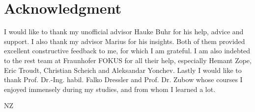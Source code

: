 
\cleardoublepage
{}
\section*{Acknowledgment}

I would like to thank my unofficial advisor Hauke Buhr for his help, advice and support. I also thank my advisor Marius for his insights. Both of them provided excellent constructive feedback to me, for which I am grateful. I am also indebted to the rest team at Fraunhofer FOKUS for all their help, especially Hemant Zope, Eric Troudt, Christian Scheich and Aleksandar Yonchev. Lastly I would like to thank Prof. Dr.-Ing. habil. Falko Dressler and Prof. Dr. Zubow whose courses I enjoyed immensely during my studies, and from whom I learned a lot.

\begin{flushright}
NZ\\[1pc]
\end{flushright}
